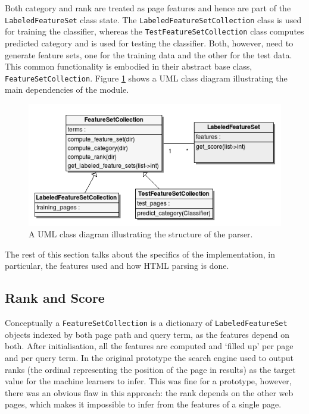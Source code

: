 \documentclass[12pt,a4paper,notitlepage,twoside]{scrbook}
\begin{document}
Both category and rank are treated as page features and hence are part of the
\texttt{LabeledFeatureSet} class state.  The
\texttt{LabeledFeatureSetCollection} class is used for training the classifier,
whereas the \texttt{TestFeatureSetCollection} class computes predicted category and is used
for testing the classifier. Both, however, need to generate
feature sets, one for the training data and the other for the test data. This
common functionality is embodied in their abstract base class,
\texttt{FeatureSetCollection}. Figure \ref{uml} shows a UML class diagram
illustrating the main dependencies of the module.

\begin{figure}[h!]
\centering
\includegraphics[scale=0.7]{figs/uml.png}
\caption{A UML class diagram illustrating the structure of the parser.}
\label{uml}
\end{figure}

The rest of this section talks about the specifics of the implementation, in
particular, the features used and how HTML parsing is done.

\subsection{Rank and Score}
Conceptually a \texttt{FeatureSetCollection} is a dictionary of \texttt{LabeledFeatureSet}
objects indexed by both page path and query term, as the features depend on both. After initialisation, all
the features are computed and `filled up' per page and per query term.
In the original prototype the search engine used to output ranks (the ordinal representing the position of the
page in results) as the target value for the machine learners to infer. This was fine for
a prototype, however, there was an obvious flaw in this approach: the rank depends
on the other web pages, which makes it impossible to infer from the features of a single
page. 
\end{document}
